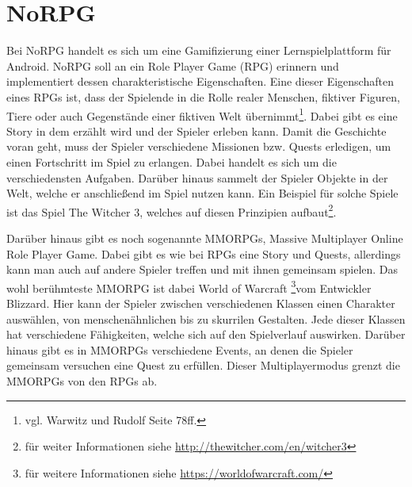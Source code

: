 \chapter{NoRPG}

		
Bei NoRPG handelt es sich um eine Gamifizierung einer Lernspielplattform für Android. NoRPG soll an ein Role Player Game (RPG) erinnern und implementiert dessen charakteristische Eigenschaften. Eine dieser Eigenschaften eines RPGs ist, dass der Spielende in die Rolle realer Menschen, fiktiver Figuren, Tiere oder auch Gegenstände einer fiktiven Welt übernimmt\footnote{vgl. Warwitz und Rudolf \cite{rpgSinn} Seite 78ff.}. Dabei gibt es eine Story in dem erzählt wird und der Spieler erleben kann. Damit die Geschichte voran geht, muss der Spieler verschiedene Missionen bzw. Quests erledigen, um einen Fortschritt im Spiel zu erlangen. Dabei handelt es sich um die verschiedensten Aufgaben. Darüber hinaus sammelt der Spieler Objekte in der Welt, welche er anschließend im Spiel nutzen kann. Ein Beispiel für solche Spiele ist das Spiel The Witcher 3, welches auf diesen Prinzipien aufbaut\footnote{für weiter Informationen siehe \url{http://thewitcher.com/en/witcher3}}.
	
Darüber hinaus gibt es noch sogenannte MMORPGs, Massive Multiplayer Online Role Player Game. Dabei gibt es wie bei RPGs eine Story und Quests, allerdings kann man auch auf andere Spieler treffen und mit ihnen gemeinsam spielen. Das wohl berühmteste MMORPG ist dabei World of Warcraft \footnote{für weitere Informationen siehe \url{https://worldofwarcraft.com/}}vom Entwickler Blizzard. Hier kann der Spieler zwischen verschiedenen Klassen einen Charakter auswählen, von menschenähnlichen bis zu skurrilen Gestalten. Jede dieser Klassen hat verschiedene Fähigkeiten, welche sich auf den Spielverlauf auswirken. Darüber hinaus gibt es in MMORPGs verschiedene Events, an denen die Spieler gemeinsam versuchen eine Quest zu erfüllen. Dieser Multiplayermodus grenzt die MMORPGs von den RPGs ab.

